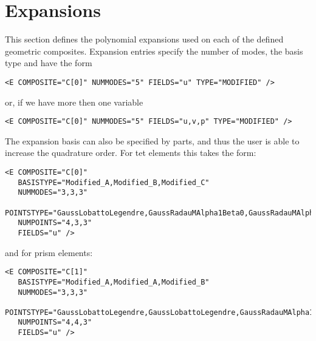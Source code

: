 \section{Expansions}
This section defines the polynomial expansions used on each of the defined
geometric composites. Expansion entries specify the number of modes, the basis
type and have the form

\begin{lstlisting}[style=XMLStyle]
<E COMPOSITE="C[0]" NUMMODES="5" FIELDS="u" TYPE="MODIFIED" />
\end{lstlisting}

or, if we have more then one variable

\begin{lstlisting}[style=XMLStyle]
<E COMPOSITE="C[0]" NUMMODES="5" FIELDS="u,v,p" TYPE="MODIFIED" />
\end{lstlisting}

The expansion basis can also be specified by parts, and thus the user is able to
increase the quadrature order. For tet elements this takes the form:

\begin{lstlisting}[style=XMLStyle]
<E COMPOSITE="C[0]" 
   BASISTYPE="Modified_A,Modified_B,Modified_C" 
   NUMMODES="3,3,3"
   POINTSTYPE="GaussLobattoLegendre,GaussRadauMAlpha1Beta0,GaussRadauMAlpha2Beta0"
   NUMPOINTS="4,3,3"
   FIELDS="u" />
\end{lstlisting}

and for prism elements:

\begin{lstlisting}[style=XMLStyle]
<E COMPOSITE="C[1]" 
   BASISTYPE="Modified_A,Modified_A,Modified_B" 
   NUMMODES="3,3,3"
   POINTSTYPE="GaussLobattoLegendre,GaussLobattoLegendre,GaussRadauMAlpha1Beta0"
   NUMPOINTS="4,4,3"
   FIELDS="u" />
\end{lstlisting}
